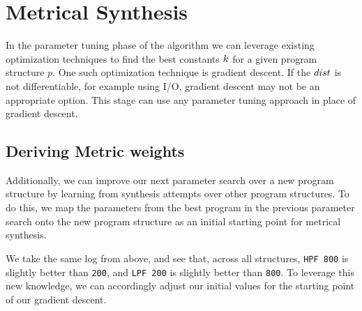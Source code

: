 \section{Metrical Synthesis}
\label{sec:opt}

In the parameter tuning phase of the algorithm we can leverage existing optimization techniques to find the best constants ${k}$ for a given program structure $p$.
One such optimization technique is gradient descent.
If the ${dist}$ is not differentiable, for example using I/O, gradient descent may not be an appropriate option.
This stage can use any parameter tuning approach in place of gradient descent.

\subsection{Deriving Metric weights}
Additionally, we can improve our next parameter search over a new program structure by learning from synthesis attempts over other program structures.
To do this, we map the parameters from the best program in the previous parameter search onto the new program structure as an initial starting point for metrical synthesis.


\begin{exmp}
We take the same log from above, and see that, across all structures, \texttt{HPF 800} is slightly better than \texttt{200}, 
  and \texttt{LPF 200} is slightly better than \texttt{800}.
To leverage this new knowledge, we can accordingly adjust our initial values for the starting point of our gradient descent.
\end{exmp}
